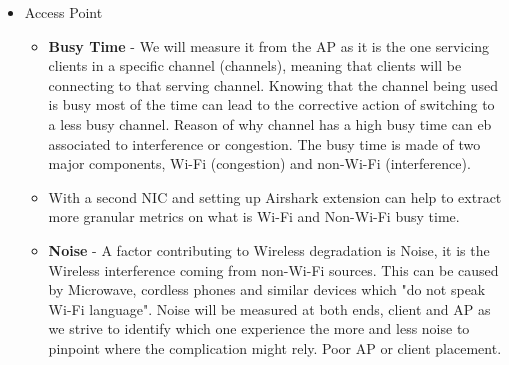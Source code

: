 \begin{itemize}
	\item Access Point
	\begin{itemize}
		\item \textbf{Busy Time} - We will measure it from the AP as it is the one servicing clients in a specific channel (channels), meaning that clients will be connecting to that serving channel. Knowing that the channel being used is busy most of the time can lead to the corrective action of switching to a less busy channel. Reason of why channel has a high busy time can eb associated to interference or congestion. The busy time is made of two major components, Wi-Fi (congestion) and non-Wi-Fi (interference).
		\item With a second NIC and setting up Airshark extension can help to extract more granular metrics on what is Wi-Fi and Non-Wi-Fi busy time.
		\item \textbf{Noise} - A factor contributing to Wireless degradation is Noise, it is the Wireless interference coming from non-Wi-Fi sources. This can be caused by Microwave, cordless phones and similar devices which "do not speak Wi-Fi language". Noise will be measured at both ends, client and AP as we strive to identify which one experience the more and less noise to pinpoint where the complication might rely. Poor AP or client placement.
		
	\end{itemize}
	
\end{itemize}
